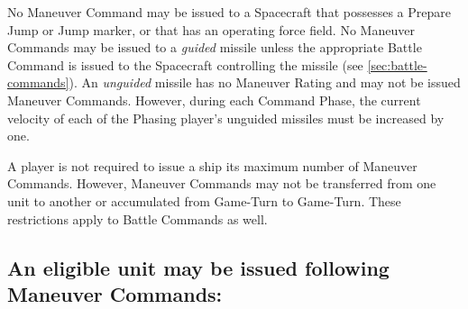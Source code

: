 No Maneuver Command may be issued to a Spacecraft that possesses a
Prepare Jump or Jump marker, or that has an operating force field. No
Maneuver Commands may be issued to a \emph{guided} missile unless the
appropriate Battle Command is issued to the Spacecraft controlling the
missile (see \ref{sec:battle-commands}). An \emph{unguided} missile has no
Maneuver Rating and may not be issued Maneuver Commands. However,
during each Command Phase, the current velocity of each of the Phasing
player's unguided missiles must be increased by one.

A player is not required to issue a ship its maximum number of
Maneuver Commands. However, Maneuver Commands may not be transferred
from one unit to another or accumulated from Game-Turn to Game-Turn.
These restrictions apply to Battle Commands as well.

\subsection[Maneuver Commands]{An eligible unit may be issued
  following Maneuver 
  Commands:}
\label{sec:maneuver-commands}

